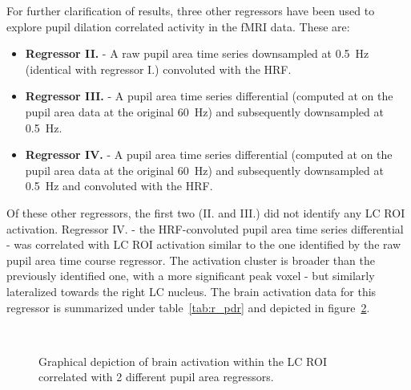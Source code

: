 	For further clarification of results, three other regressors have been used to explore pupil dilation correlated activity in the fMRI data.
	These are:
	\begin{itemize}
	    \item \textbf{Regressor II.} - A raw pupil area time series downsampled at \SI{0.5}{\hertz} (identical with regressor I.) convoluted with the HRF.
	    \item \textbf{Regressor III.} - A pupil area time series differential (computed at on the pupil area data at the original \SI{60}{\hertz}) and subsequently downsampled at \SI{0.5}{\hertz}. 
	    \item \textbf{Regressor IV.} - A pupil area time series differential (computed at on the pupil area data at the original \SI{60}{\hertz}) and subsequently downsampled at \SI{0.5}{\hertz} and convoluted with the HRF.
	\end{itemize}
	
	Of these other regressors, the first two (II. and III.) did not identify any LC ROI activation.
	Regressor IV. - the HRF-convoluted pupil area time series differential - was correlated with LC ROI activation similar to the one identified by the raw pupil area time course regressor.
	The activation cluster is broader than the previously identified one, with a more significant peak voxel - but similarly lateralized towards the right LC nucleus.
	The brain activation data for this regressor is summarized under table~\ref{tab:r_pdr} and depicted in figure~\ref{fig:r_pdr_c}.
	
	
	\begin{figure}[H]
	    \begin{subfigure}[H]{0.495\textwidth}
		\centering{}
		\label{fig:r_pdr_nc}
	    \end{subfigure}
	    ~%
	    \begin{subfigure}[H]{0.495\textwidth}
		\centering{}
		\label{fig:r_pdr_c}
	    \end{subfigure}
	    \caption{Graphical depiction of brain activation within the LC ROI correlated with 2 different pupil area regressors.}
	    \label{fig:r_pdr}
	\end{figure}
